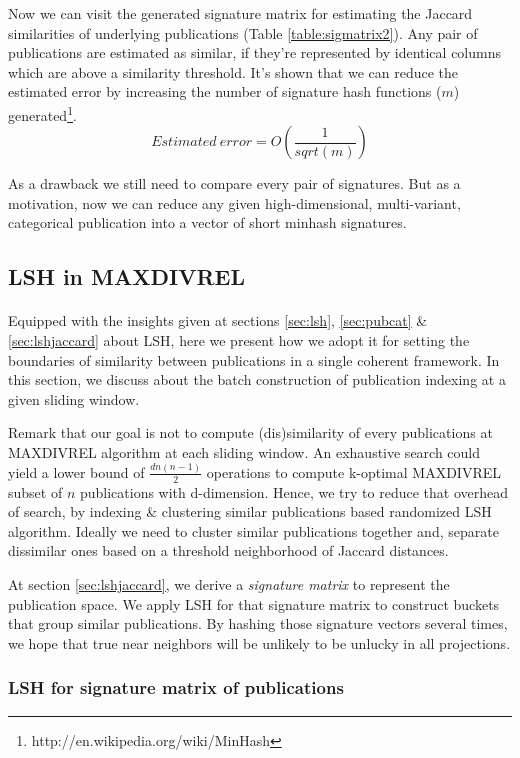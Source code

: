 \documentclass[a4paper,12pt,oneside]{book}
\theoremstyle{definition}
\theoremstyle{remark}
\begin{document}
Now we can visit the generated signature matrix for estimating the Jaccard similarities of underlying publications (Table \ref{table:sigmatrix2}). Any pair of publications are estimated as similar, if they're represented by identical columns which are above a similarity threshold. It's shown that we can reduce the estimated error by increasing the number of signature hash functions ($m$) generated\footnote{http://en.wikipedia.org/wiki/MinHash}.
\[ Estimated\ error=O(\frac{1}{sqrt(m)})\]

As a drawback we still need to compare every pair of signatures. But as a motivation, now we can reduce any given high-dimensional, multi-variant, categorical publication into a vector of short minhash signatures.

\subsection{LSH in MAXDIVREL}
\paragraph*{}
Equipped with the insights given at sections \ref{sec:lsh}, \ref{sec:pubcat} \& \ref{sec:lshjaccard} about \ac{LSH}, here we present how we adopt it for setting the boundaries of similarity between publications in a single coherent framework. In this section, we discuss about the batch construction of publication indexing at a given sliding window.

Remark that our goal is not to compute (dis)similarity of every publications at MAXDIVREL algorithm at each sliding window. An exhaustive search could yield a lower bound of $\frac{dn(n-1)}{2}$ operations to compute k-optimal MAXDIVREL subset of $n$ publications with d-dimension. Hence, we try to reduce that overhead of search, by indexing \& clustering similar publications based randomized \ac{LSH} algorithm. Ideally we need to cluster similar publications together and, separate dissimilar ones based on a threshold neighborhood of Jaccard distances.

At section \ref{sec:lshjaccard}, we derive a \emph{signature matrix} to represent the publication space. We apply \ac{LSH} for that signature matrix to construct buckets that group similar publications. By hashing those signature vectors several times, we hope that true near neighbors will be unlikely to be unlucky in all projections. 

\subsubsection{LSH for signature matrix of publications}
\end{document}
